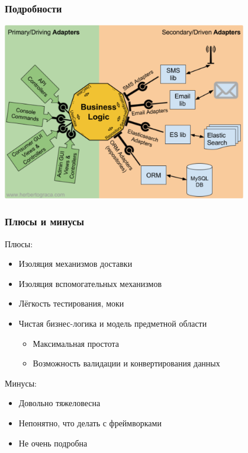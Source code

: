 \documentclass{../../slides-style}
\begin{document}
    \begin{frame}
        \frametitle{Подробности}
        \begin{center}
            \includegraphics[width=0.8\textwidth]{hexagonalArchitectureDetails.png}
        \end{center}
    \end{frame}

    \begin{frame}
        \frametitle{Плюсы и минусы}
        Плюсы:
        \begin{itemize}
            \item Изоляция механизмов доставки
            \item Изоляция вспомогательных механизмов
            \item Лёгкость тестирования, моки
            \item Чистая бизнес-логика и модель предметной области
            \begin{itemize}
                \item Максимальная простота
                \item Возможность валидации и конвертирования данных
            \end{itemize}
        \end{itemize}
        \vspace{5mm}
        Минусы:
        \begin{itemize}
            \item Довольно тяжеловесна
            \item Непонятно, что делать с фреймворками
            \item Не очень подробна
        \end{itemize}
    \end{frame}
\end{document}
